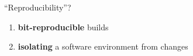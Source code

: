 \documentclass{beamer}
\begin{document}
\begin{frame}{``Reproducibility''?}

  \Large{
    \begin{enumerate}
    \item<2-> \textbf{bit-reproducible} builds

    \item<3-> \textbf{isolating} a software environment from changes

       {
      }


\end{enumerate}}
\end{frame}
\end{document}
